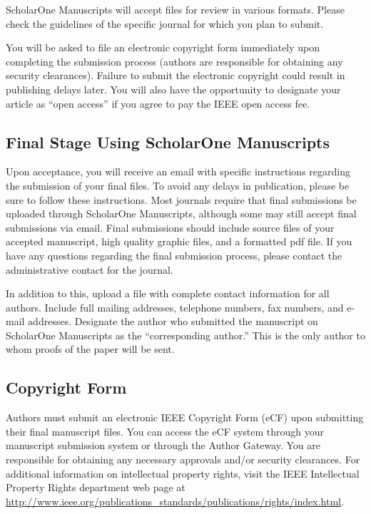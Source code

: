 \documentclass[journal,twoside,web]{ieeecolor}
\begin{document}
ScholarOne Manuscripts will accept files for review in various formats. 
Please check the guidelines of the specific journal for which you plan to 
submit.

You will be asked to file an electronic copyright form immediately upon 
completing the submission process (authors are responsible for obtaining any 
security clearances). Failure to submit the electronic copyright could 
result in publishing delays later. You will also have the opportunity to 
designate your article as ``open access'' if you agree to pay the IEEE open 
access fee. 

\subsection{Final Stage Using ScholarOne Manuscripts}
Upon acceptance, you will receive an email with specific instructions 
regarding the submission of your final files. To avoid any delays in 
publication, please be sure to follow these instructions. Most journals 
require that final submissions be uploaded through ScholarOne Manuscripts, 
although some may still accept final submissions via email. Final 
submissions should include source files of your accepted manuscript, high 
quality graphic files, and a formatted pdf file. If you have any questions 
regarding the final submission process, please contact the administrative 
contact for the journal. 

In addition to this, upload a file with complete contact information for all 
authors. Include full mailing addresses, telephone numbers, fax numbers, and 
e-mail addresses. Designate the author who submitted the manuscript on 
ScholarOne Manuscripts as the ``corresponding author.'' This is the only 
author to whom proofs of the paper will be sent. 

\subsection{Copyright Form}
Authors must submit an electronic IEEE Copyright Form (eCF) upon submitting 
their final manuscript files. You can access the eCF system through your 
manuscript submission system or through the Author Gateway. You are 
responsible for obtaining any necessary approvals and/or security 
clearances. For additional information on intellectual property rights, 
visit the IEEE Intellectual Property Rights department web page at 
\underline{http://www.ieee.org/publications\_standards/publications/rights/}\discretionary{}{}{}\underline{index.html}. 
\end{document}
